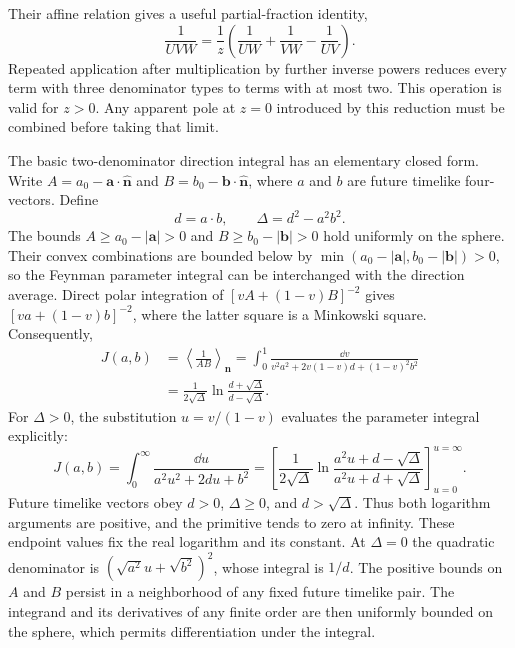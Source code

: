 Their affine relation gives a useful partial-fraction identity,
\begin{equation}
 \frac1{UVW}=\frac1z\left(\frac1{UW}+\frac1{VW}-\frac1{UV}\right).
 \label{eq:comp-real-three-poles}
\end{equation}
Repeated application after multiplication by further inverse powers
reduces every term with three denominator types to terms with at
most two. This operation is valid for $z>0$. Any apparent pole at
$z=0$ introduced by this reduction must be combined before taking
that limit.

The basic two-denominator direction integral has an elementary
closed form. Write $A=a_0-\bm a\cdot\widehat{\bm n}$ and
$B=b_0-\bm b\cdot\widehat{\bm n}$, where $a$ and $b$ are future
timelike four-vectors. Define
\begin{equation}
 d=a\cdot b,\qquad \Delta=d^2-a^2b^2.
\end{equation}
The bounds $A\geq a_0-|\bm a|>0$ and
$B\geq b_0-|\bm b|>0$ hold uniformly on the sphere. Their convex
combinations are bounded below by
$\min(a_0-|\bm a|,b_0-|\bm b|)>0$, so the Feynman parameter integral
can be interchanged with the direction average.
Direct polar integration of $[vA+(1-v)B]^{-2}$ gives
$[va+(1-v)b]^{-2}$, where the latter square is a Minkowski square.
Consequently,
\begin{align}
 J(a,b)&=\left\langle\frac1{AB}\right\rangle_{\bm n}
 =\int_0^1\frac{\dd v}{v^2a^2+2v(1-v)d+(1-v)^2b^2}\\
 &=\frac1{2\sqrt\Delta}\ln\frac{d+\sqrt\Delta}{d-\sqrt\Delta}.
 \label{eq:comp-real-angular-master}
\end{align}
For $\Delta>0$, the substitution $u=v/(1-v)$ evaluates the parameter
integral explicitly:
\begin{equation}
 J(a,b)=\int_0^\infty\frac{\dd u}{a^2u^2+2du+b^2}
 =\left[\frac1{2\sqrt\Delta}
 \ln\frac{a^2u+d-\sqrt\Delta}{a^2u+d+\sqrt\Delta}
 \right]_{u=0}^{u=\infty}.
\end{equation}
Future timelike vectors obey $d>0$, $\Delta\geq0$, and
$d>\sqrt\Delta$. Thus both logarithm arguments are positive, and
the primitive tends to zero at infinity. These endpoint values fix
the real logarithm and its constant. At $\Delta=0$ the quadratic
denominator is $(\sqrt{a^2}u+\sqrt{b^2})^2$, whose integral is $1/d$.
The positive bounds on $A$ and $B$ persist in a neighborhood of any
fixed future timelike pair. The integrand and its derivatives of any
finite order are then uniformly bounded on the sphere, which permits
differentiation under the integral.
